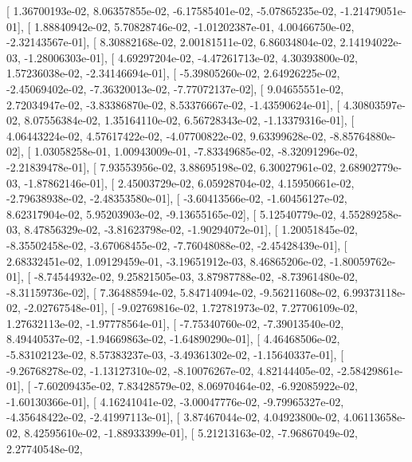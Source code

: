 \documentclass{article}
\begin{document}
       [  1.36700193e-02,   8.06357855e-02,  -6.17585401e-02,
         -5.07865235e-02,  -1.21479051e-01],
       [  1.88840942e-02,   5.70828746e-02,  -1.01202387e-01,
          4.00466750e-02,  -2.32143567e-01],
       [  8.30882168e-02,   2.00181511e-02,   6.86034804e-02,
          2.14194022e-03,  -1.28006303e-01],
       [  4.69297204e-02,  -4.47261713e-02,   4.30393800e-02,
          1.57236038e-02,  -2.34146694e-01],
       [ -5.39805260e-02,   2.64926225e-02,  -2.45069402e-02,
         -7.36320013e-02,  -7.77072137e-02],
       [  9.04655551e-02,   2.72034947e-02,  -3.83386870e-02,
          8.53376667e-02,  -1.43590624e-01],
       [  4.30803597e-02,   8.07556384e-02,   1.35164110e-02,
          6.56728343e-02,  -1.13379316e-01],
       [  4.06443224e-02,   4.57617422e-02,  -4.07700822e-02,
          9.63399628e-02,  -8.85764880e-02],
       [  1.03058258e-01,   1.00943009e-01,  -7.83349685e-02,
         -8.32091296e-02,  -2.21839478e-01],
       [  7.93553956e-02,   3.88695198e-02,   6.30027961e-02,
          2.68902779e-03,  -1.87862146e-01],
       [  2.45003729e-02,   6.05928704e-02,   4.15950661e-02,
         -2.79638938e-02,  -2.48353580e-01],
       [ -3.60413566e-02,  -1.60456127e-02,   8.62317904e-02,
          5.95203903e-02,  -9.13655165e-02],
       [  5.12540779e-02,   4.55289258e-03,   8.47856329e-02,
         -3.81623798e-02,  -1.90294072e-01],
       [  1.20051845e-02,  -8.35502458e-02,  -3.67068455e-02,
         -7.76048088e-02,  -2.45428439e-01],
       [  2.68332451e-02,   1.09129459e-01,  -3.19651912e-03,
          8.46865206e-02,  -1.80059762e-01],
       [ -8.74544932e-02,   9.25821505e-03,   3.87987788e-02,
         -8.73961480e-02,  -8.31159736e-02],
       [  7.36488594e-02,   5.84714094e-02,  -9.56211608e-02,
          6.99373118e-02,  -2.02767548e-01],
       [ -9.02769816e-02,   1.72781973e-02,   7.27706109e-02,
          1.27632113e-02,  -1.97778564e-01],
       [ -7.75340760e-02,  -7.39013540e-02,   8.49440537e-02,
         -1.94669863e-02,  -1.64890290e-01],
       [  4.46468506e-02,  -5.83102123e-02,   8.57383237e-03,
         -3.49361302e-02,  -1.15640337e-01],
       [ -9.26768278e-02,  -1.13127310e-02,  -8.10076267e-02,
          4.82144405e-02,  -2.58429861e-01],
       [ -7.60209435e-02,   7.83428579e-02,   8.06970464e-02,
         -6.92085922e-02,  -1.60130366e-01],
       [  4.16241041e-02,  -3.00047776e-02,  -9.79965327e-02,
         -4.35648422e-02,  -2.41997113e-01],
       [  3.87467044e-02,   4.04923800e-02,   4.06113658e-02,
          8.42595610e-02,  -1.88933399e-01],
       [  5.21213163e-02,  -7.96867049e-02,   2.27740548e-02,
\end{document}

